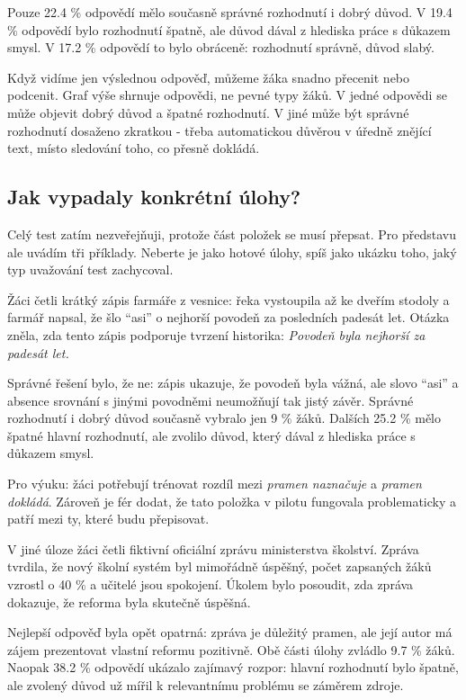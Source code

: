 \documentclass[
  12pt,
  english,
  a4paper,
  extrafontsizes,onecolumn,openright
  ]{memoir}
\begin{document}
\normalsize

Pouze 22.4 \% odpovědí mělo současně správné rozhodnutí i dobrý
důvod. V 19.4 \% odpovědí bylo rozhodnutí špatně, ale důvod
dával z hlediska práce s důkazem smysl. V 17.2 \% odpovědí to
bylo obráceně: rozhodnutí správně, důvod slabý.

Když vidíme jen výslednou odpověď, můžeme žáka snadno přecenit nebo
podcenit. Graf výše shrnuje odpovědi, ne pevné typy žáků. V jedné
odpovědi se může objevit dobrý důvod a špatné rozhodnutí. V jiné může být
správné rozhodnutí dosaženo zkratkou - třeba automatickou důvěrou v
úředně znějící text, místo sledování toho, co přesně dokládá.

\subsection{Jak vypadaly konkrétní úlohy?}\label{jak-vypadaly-konkruxe9tnuxed-uxfalohy}

Celý test zatím nezveřejňuji, protože část položek se musí přepsat. Pro
představu ale uvádím tři příklady. Neberte je jako hotové úlohy, spíš jako
ukázku toho, jaký typ uvažování test zachycoval.

Žáci četli krátký zápis farmáře z vesnice: řeka vystoupila až ke
dveřím stodoly a farmář napsal, že šlo \enquote{asi} o nejhorší povodeň za
posledních padesát let. Otázka zněla, zda tento zápis podporuje tvrzení
historika:
\emph{Povodeň byla nejhorší za padesát let.}

Správné řešení bylo, že ne: zápis ukazuje, že povodeň byla vážná, ale
slovo \enquote{asi} a absence srovnání s jinými povodněmi neumožňují tak jistý
závěr. Správné rozhodnutí i dobrý důvod současně vybralo jen
9 \% žáků. Dalších
25.2 \% mělo špatné hlavní
rozhodnutí, ale zvolilo důvod, který dával z hlediska práce s důkazem
smysl.

Pro výuku: žáci potřebují trénovat rozdíl mezi
\emph{pramen naznačuje} a \emph{pramen dokládá}. Zároveň je fér dodat, že tato
položka v pilotu fungovala problematicky a patří mezi ty, které budu
přepisovat.

V jiné úloze žáci četli fiktivní oficiální zprávu ministerstva školství.
Zpráva tvrdila, že nový školní systém byl mimořádně úspěšný, počet
zapsaných žáků vzrostl o 40 \% a učitelé jsou spokojení. Úkolem bylo
posoudit, zda zpráva dokazuje, že reforma byla skutečně úspěšná.

Nejlepší odpověď byla opět opatrná: zpráva je důležitý pramen, ale její
autor má zájem prezentovat vlastní reformu pozitivně. Obě části úlohy
zvládlo 9.7 \% žáků.
Naopak 38.2 \% odpovědí
ukázalo zajímavý rozpor: hlavní rozhodnutí bylo špatně, ale zvolený důvod
už mířil k relevantnímu problému se záměrem zdroje.
\end{document}
